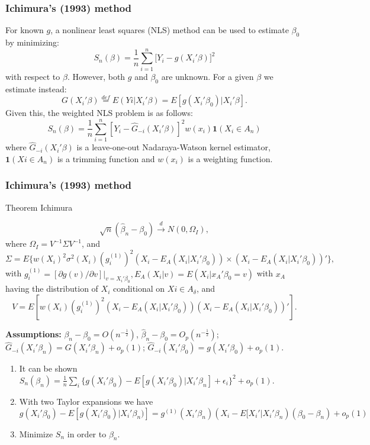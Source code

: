 \documentclass{beamer}
\begin{document}
\begin{frame}
\frametitle{Ichimura's (1993) method}
For known $g$, a nonlinear least squares (NLS) method can be used to estimate $\beta_0$ by minimizing:
\begin{equation}
S_n(\beta) = \frac{1}{n}\sum_{i = 1}^n\big[Y_i - g(X_i'\beta)\big]^2
\end{equation}
with respect to $\beta$. 
However, both $g$ and $\beta_0$ are unknown. For a given $\beta$ we estimate instead:
\begin{equation}
G(X_i'\beta) \stackrel{def}{=} E(Yi|X_i'\beta) = E[g(X_i'\beta_0)|X_i'\beta].
\end{equation}
Given this, the weighted NLS problem is as follows:
\begin{equation}
S_n(\beta) = \frac{1}{n} \sum_{i=1}^{n}  [Y_i - \hat{G}_{-i}(X_i'\beta)]^2w(x_i)\mathbf{1}{(X_i \in A_n)}
\end{equation}
where $\hat{G}_{-i}(X_i'\beta)$ is a leave-one-out Nadaraya-Watson kernel estimator,  $\mathbf{1}{(Xi \in A_n)}$ is a trimming function and $w(x_i)$ is a weighting function.
\end{frame}




\begin{frame}
\frametitle{Ichimura's (1993) method}
\begin{block}{Theorem Ichimura}
{\footnotesize \[ \sqrt{n}(\hat{\beta}_n - \beta_0) \stackrel{d}{\rightarrow} N(0,\Omega_I), \] where $\Omega_I = V^{-1}\Sigma V^{-1}$, and \[\Sigma = E\{w(X_i)^2\sigma^2(X_i)(g_i^{(1)})^2(X_i - E_A(X_i|X_i'\beta_0)) \times (X_i - E_A(X_i|X_i'\beta_0))'\},\] with $g_i^{(1)} = [\partial g(v)/\partial v]|_{v = X_i'\beta_0}, E_A(X_i|v) = E(X_i|x_A'\beta_0 = v)$ with $x_A$ having the distribution of $X_i$ conditional on $Xi \in A_\delta$, and \[ V = E[w(X_i)(g_i^{(1)})^2(X_i - E_A(X_i|X_i'\beta_0))(X_i - E_A(X_i|X_i'\beta_0))'].\] \par}
\end{block}

{\footnotesize \textbf{Assumptions:} $\beta_n - \beta_0 = O(n^{-\frac{1}{2}})$, $\hat{\beta}_n - \beta_0 = O_p(n^{-\frac{1}{2}})$; $ \hat{G}_{-i}(X_i'\beta_n) = G(X_i'\beta_n) + o_p(1)$; $\hat{G}_{-i}(X_i'\beta_0) = g(X_i'\beta_0) + o_p(1)$. \par}
\begin{enumerate}
	\item It can be shown $ S_{n}(\beta_n) = \frac{1}{n}\sum_i \{ g(X_i'\beta_0) - E[g(X_i'\beta_0)|X_i'\beta_n] +  \epsilon_i\}^2 + o_p(1)$.	
	\item With two Taylor expansions we have
$g(X_i'\beta_0) - E[g(X_i'\beta_0)|X_i'\beta_n)] 
 = g^{(1)}(X_i'\beta_n)( X_i - E[X_i'|X_i'\beta_n)(\beta_0 - \beta_n) + o_p(1)$
	\item Minimize $S_n$ in order to $\beta_n$.

\end{enumerate}

\end{frame}
\end{document}
